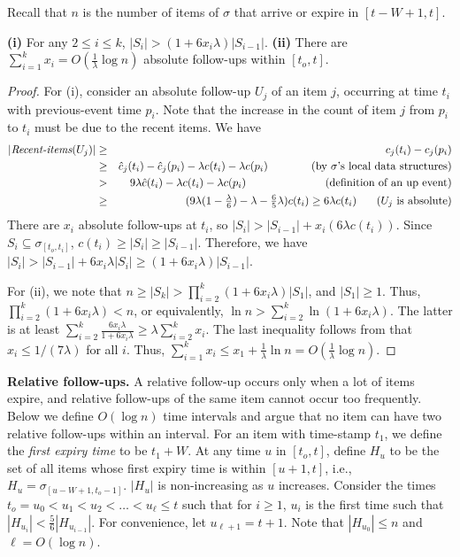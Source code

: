 \documentclass[proceedings]{stacs}
\theoremstyle{definition}\newtheorem{fact}{Fact}
\newcommand{\ri}{\mbox{\it Recent-items}}
\newcommand{\ns}{c}
\newcommand{\hns}{\hat c}
\newcommand{\cjs}{c_{j}}
\newcommand{\hcjs}{\hat c_{j}}
\begin{document}
 {Recall that $n$ is the number of items of $\sigma$
  that arrive or expire in $[t-W+1, t]$.}

\begin{lemma} \label{lem:fi-step-up-s-simple}
{\bf (i)} For any $2 \le i \le k$, $|S_i| > (1 + 6 x_i \lambda)
|S_{i-1}|$.
{\bf (ii)} There are $\sum_{i=1}^{k} x_i = O(\frac{1}{\lambda} \log n)$
absolute follow-ups within $[t_o, t]$.
\end{lemma}

\begin{proof}
For (i), consider an absolute follow-up $U_j$ of an item $j$,
occurring at time $t_i$ with previous-event time $p_i$.
Note that the increase in the count of item $j$ from $p_i$ to $t_i$ must be due to the recent
items. We have
\begin{eqnarray*}
|\ri(U_j)|
& \ge & \cjs(t_i) - \cjs(p_i) \\
&\ge & \hcjs(t_i) - \hcjs(p_i) - \lambda \ns(t_i) - \lambda \ns(p_i)
\hspace{.545in}\mbox{(by $\sigma$'s local data structures)}\\
& > & 9 \lambda \hns(t_i) - \lambda \ns(t_i) - \lambda \ns(p_i)
\hspace{.995in}\mbox{(definition of an up event)}\\
& \ge & \textstyle(9 \lambda (1 - \frac{\lambda}{6}) - \lambda - \frac{6}{5} \lambda)\ns(t_i)
\ge 6 \lambda \ns(t_i) \hspace{.25in}\mbox{($U_j$ is absolute)}
\end{eqnarray*}
There are $x_i$ absolute follow-ups at $t_i$,
so $|S_{i}| > |S_{i-1}| + x_i \left(6 \lambda \ns(t_i)\right)$.
Since $S_i \subseteq \sigma_{[t_o, t_i]}$,
$\ns(t_i) \ge |S_i| \ge |S_{i-1}|$.
Therefore, we have $|S_i| > |S_{i-1}| + 6 x_i \lambda |S_i|
\ge (1 + 6 x_i \lambda) |S_{i-1}|$.


For (ii), we note that $n \ge |S_k|
> \prod_{i = 2}^{k} (1 + 6  x_i \lambda) |S_{1}|$,
and $|S_1| \ge 1$.
Thus, $\prod_{i = 2}^{k} (1 + 6 x_i \lambda) < n$,
or equivalently, $\ln n > \sum_{i = 2}^{k} \ln(1 + 6 x_i \lambda)$.
The latter is at least
$\sum_{i=2}^{k} \frac{6 x_i\lambda}{1+ 6 x_i\lambda}
\geq
\lambda \sum_{i=2}^{k} x_i$.
The last inequality follows from that $x_i \le 1 / (7 \lambda)$ for all $i$.
Thus, $\sum_{i=1}^{k} x_i
\le x_1 + \frac{1}{\lambda} \ln n
= O( \frac{1}{\lambda} \log n)$.
\end{proof}

{\bf Relative follow-ups.}
A relative follow-up occurs only when a lot of items expire,
and relative follow-ups of the same item cannot occur
too frequently. Below we define $O(\log n)$ time intervals
and argue that no item can have two relative follow-ups within
an interval.
For an item with time-stamp $t_1$,
we define the \emph{first expiry time} to be $t_1+W$.
At any time $u$ in $[t_o,t]$, define $H_u$
to be the set of all items whose
first expiry time is within $[u+1, t]$,
i.e., $H_u = \sigma_{[u-W+1,t_o-1]}$.
$|H_u|$ is non-increasing as $u$ increases.
Consider the times $t_o = u_0 < u_1 < u_2 < \dots< u_\ell \le t$
such that for $i \ge 1$, $u_i$ is the first time
such that $|H_{u_i}| < \frac{5}{6}|H_{u_{i-1}}|$.
For convenience, let $u_{\ell + 1} = t+1$.
Note that $| H_{u_0} | \le n$ and $\ell = O(\log n)$.
\end{document}
